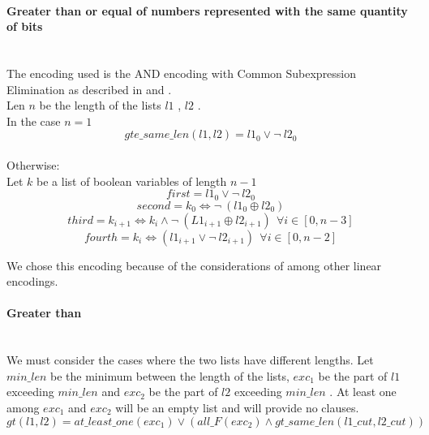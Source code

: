   \paragraph*{Greater than or equal of numbers represented with the same quantity of bits} \hfill \\
    The encoding used is the AND encoding with Common Subexpression Elimination as described in 
    \cite{Elgabou} and \cite{Zhao}.\\
    Len \(n\)  be the length of the lists \(l1\) , \(l2\) .\\
    In the case \(n = 1\) 
    \begin{equation}
      gte\_same\_len(l1, l2) = l1_0 \lor \neg \ l2_0
    \end{equation}\\

    Otherwise:\\
    Let \(k\)  be a list of boolean variables of length \(n-1\) 
    \begin{equation}
      first = l1_0 \lor \neg \ l2_0
    \end{equation}
    \begin{equation}
      second = k_0 \Longleftrightarrow \neg \ (l1_0 \oplus l2_0)
    \end{equation}
    \begin{equation}
      third = k_{i+1} \Longleftrightarrow k_i \land \neg \ (L1_{i+1} \oplus l2_{i+1}) \ \ \forall i \in [0, n-3]
    \end{equation}
    \begin{equation}
      fourth = k_i \Longleftrightarrow (l1_{i+1} \lor \neg \ l2_{i+1}) \ \ \forall i \in [0, n-2]
    \end{equation}

    We chose this encoding because of the considerations of \cite{Zhao} among other linear encodings.

  \paragraph*{Greater than}  \hfill \\
    We must consider the cases where the two lists have different lengths.
    Let \(min\_len\)  be the minimum between the length of the lists, \(exc_1\)  be the part of \(l1\)  
    exceeding \(min\_len\)  and \(exc_2\)  
    be the part of \(l2\)  exceeding \(min\_len\) . At least one among \(exc_1\)  and \(exc_2\)  will be an
    empty list and will provide no clauses.\\
    \begin{equation}
      gt(l1, l2) = at\_least\_one(exc_1) \lor ( all\_F(exc_2) \land gt\_same\_len(l1\_cut, l2\_cut))
    \end{equation}

